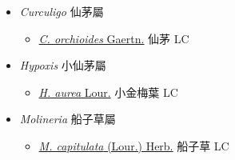 
  \begin{itemize}
 \item[] \textit{Curculigo} 仙茅屬
                    
  \begin{itemize}
        \item[] \href{http://www.theplantlist.org/tpl1.1/search?q=Curculigo+orchioides}{\textit{C. orchioides} Gaertn.}   仙茅 LC
  \end{itemize}
 \item[] \textit{Hypoxis} 小仙茅屬
                    
  \begin{itemize}
        \item[] \href{http://www.theplantlist.org/tpl1.1/search?q=Hypoxis+aurea}{\textit{H. aurea} Lour.}   小金梅葉 LC
  \end{itemize}
 \item[] \textit{Molineria} 船子草屬
                    
  \begin{itemize}
        \item[] \href{http://www.theplantlist.org/tpl1.1/search?q=Molineria+capitulata}{\textit{M. capitulata} (Lour.) Herb.}     船子草 LC
  \end{itemize}
  \end{itemize}
